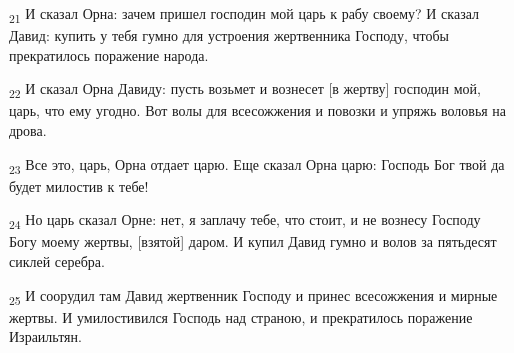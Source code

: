 \begin{tcolorbox}
\textsubscript{21} И сказал Орна: зачем пришел господин мой царь к рабу своему? И сказал Давид: купить у тебя гумно для устроения жертвенника Господу, чтобы прекратилось поражение народа.
\end{tcolorbox}
\begin{tcolorbox}
\textsubscript{22} И сказал Орна Давиду: пусть возьмет и вознесет [в жертву] господин мой, царь, что ему угодно. Вот волы для всесожжения и повозки и упряжь воловья на дрова.
\end{tcolorbox}
\begin{tcolorbox}
\textsubscript{23} Все это, царь, Орна отдает царю. Еще сказал Орна царю: Господь Бог твой да будет милостив к тебе!
\end{tcolorbox}
\begin{tcolorbox}
\textsubscript{24} Но царь сказал Орне: нет, я заплачу тебе, что стоит, и не вознесу Господу Богу моему жертвы, [взятой] даром. И купил Давид гумно и волов за пятьдесят сиклей серебра.
\end{tcolorbox}
\begin{tcolorbox}
\textsubscript{25} И соорудил там Давид жертвенник Господу и принес всесожжения и мирные жертвы. И умилостивился Господь над страною, и прекратилось поражение Израильтян.
\end{tcolorbox}
